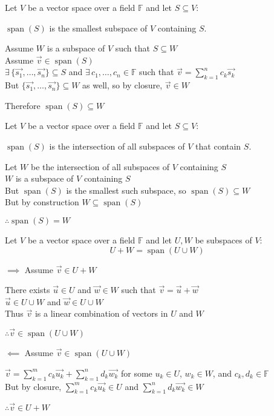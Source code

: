 \documentclass[letterpaper,12pt,fleqn]{article}
\newcommand{\F}{\mathbb{F}}
\newcommand{\vu}{\vec{u}}
\newcommand{\vv}{\vec{v}}
\newcommand{\vw}{\vec{w}}
\DeclareMathOperator{\spn}{span}
\begin{document}
\begin{theorem}
  Let $V$ be a vector space over a field $\F$ and let $S\subseteq V$:

  $\spn(S)$ is the smallest subspace of $V$ containing $S$.
\end{theorem}

\begin{theproof}
  Assume $W$ is a subspace of $V$ such that $S\subseteq W$ \\
  Assume $\vv\in\spn(S)$ \\
  $\exists\,\{\vec{s_1},\ldots,\vec{s_n}\}\subseteq S$ and
  $\exists\,c_1,\ldots,c_n\in\F$ such that $\vv=\sum_{k=1}^nc_k\vec{s_k}$ \\
  But $\{\vec{s_1},\ldots,\vec{s_n}\}\subseteq W$ as well, so by closure,
  $\vv\in W$

  Therefore $\spn(S)\subseteq W$
\end{theproof}

\begin{corollary}
  Let $V$ be a vector space over a field $\F$ and let $S\subseteq V$:

  $\spn(S)$ is the intersection of all subspaces of $V$ that contain $S$.
\end{corollary}

\begin{theproof}
  Let $W$ be the intersection of all subspaces of $V$ containing $S$ \\
  $W$ is a subspace of $V$ containing $S$ \\
  But $\spn(S)$ is the smallest such subspace, so $\spn(S)\subseteq W$ \\
  But by construction $W\subseteq\spn(S)$

  $\therefore \spn(S)=W$
\end{theproof}

\begin{theorem}
  Let $V$ be a vector space over a field $\F$ and let $U,W$ be subspaces of $V$:
  \[U+W=\spn(U\cup W)\]
\end{theorem}

\begin{theproof}
  \listbreak
  \begin{description}
  \item $\implies$ Assume $\vv\in U+W$

    There exists $\vu\in U$ and $\vw\in W$ such that $\vv=\vu+\vw$ \\
    $\vu\in U\cup W$ and $\vw\in U\cup W$ \\
    Thus $\vv$ is a linear combination of vectors in $U$ and $W$

    $\therefore \vv\in\spn(U\cup W)$

  \item $\impliedby$ Assume $\vv\in\spn(U\cup W)$

    $\vv=\sum_{k=1}^mc_k\vec{u_k}+\sum_{k=1}^nd_k\vec{w_k}$ for some
    $u_k\in U$, $w_k\in W$, and $c_k,d_k\in\F$ \\
    But by closure, $\sum_{k=1}^mc_k\vec{u_k}\in U$ and
    $\sum_{k=1}^nd_k\vec{w_k}\in W$

    $\therefore \vv\in U+W$
  \end{description}
\end{theproof}
\end{document}
